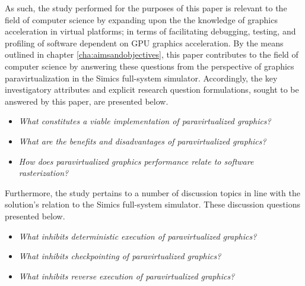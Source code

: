 As such, the study performed for the purposes of this paper is relevant to the field of computer science by expanding upon the the knowledge of graphics acceleration in virtual platforms; in terms of facilitating debugging, testing, and profiling of software dependent on GPU graphics acceleration.
By the means outlined in chapter \ref{cha:aimsandobjectives}, this paper contributes to the field of computer science by answering these questions from the perspective of graphics paravirtualization in the Simics full-system simulator.
Accordingly, the key investigatory attributes and explicit research question formulations, sought to be answered by this paper, are presented below.

\newcommand*\researchquestionitem[2]{\item[#1:] \textit{#2}}
\begin{itemize}[noitemsep]
	\researchquestionitem{1}{What constitutes a viable implementation of paravirtualized graphics?}
	\researchquestionitem{2}{What are the benefits and disadvantages of paravirtualized graphics?}
	\researchquestionitem{3}{How does paravirtualized graphics performance relate to software rasterization?}
\end{itemize}

Furthermore, the study pertains to a number of discussion topics in line with the solution's relation to the Simics full-system simulator. These discussion questions presented below.

\begin{itemize}[noitemsep]
	\researchquestionitem{1}{What inhibits deterministic execution of paravirtualized graphics?}
	\researchquestionitem{2}{What inhibits checkpointing of paravirtualized graphics?}
	\researchquestionitem{3}{What inhibits reverse execution of paravirtualized graphics?}
\end{itemize}
